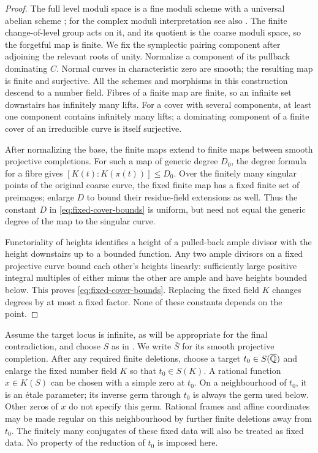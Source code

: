 \begin{proof}
The full level moduli space is a fine moduli scheme with a universal abelian
scheme \cite[Chapter~I, Theorem~1.4]{Chai1985}; for the complex moduli
interpretation see also \cite[Theorem~4.6 and Corollary~4.7]{MilneModuli2013}.
The finite change-of-level group acts on it, and its quotient is the
coarse moduli space, so the forgetful map is finite.  We fix the
symplectic pairing component after adjoining the relevant roots of unity.
Normalize a component of its
pullback dominating $C$.  Normal curves in characteristic zero are smooth;
the resulting map is finite and surjective.  All the schemes and morphisms
in this construction descend to a number field.  Fibres of a finite map are
finite, so an infinite set downstairs has infinitely many lifts.  For a
cover with several components, at least one component contains infinitely
many lifts; a dominating component of a finite cover of an irreducible
curve is itself surjective.

After normalizing the base, the finite maps extend to finite maps between
smooth projective completions.  For such a map of generic degree $D_0$,
the degree formula for a fibre gives
$[K(t):K(\pi(t))]\leq D_0$.  Over the finitely many singular points of
the original coarse curve, the fixed finite map has a fixed finite set
of preimages; enlarge $D$ to bound their residue-field extensions as
well.  Thus the constant $D$ in \eqref{eq:fixed-cover-bounds} is uniform,
but need not equal the generic degree of the map to the singular curve.

Functoriality of heights identifies a height of a pulled-back ample
divisor with the height downstairs up to a bounded function.  Any two
ample divisors on a fixed projective curve bound each other's heights
linearly: sufficiently large positive integral multiples of either minus
the other are ample and have heights bounded below.  This proves
\eqref{eq:fixed-cover-bounds}.  Replacing the fixed field $K$ changes
degrees by at most a fixed factor.  None of these constants depends on the
point.
\end{proof}

Assume the target locus is infinite, as will be appropriate for the final
contradiction, and choose $S$ as in .  We write
$\bar S$ for its smooth projective completion.  After any required finite
deletions, choose a target $t_0\in S(\overline{\mathbb Q})$ and enlarge the fixed number
field $K$ so that $t_0\in S(K)$.  A rational function $x\in K(S)$ can be
chosen with a simple zero at $t_0$.  On a neighbourhood of $t_0$, it is an
\'etale parameter; its inverse germ through $t_0$ is always the germ used
below.  Other zeros of $x$ do not specify this germ.  Rational frames and
affine coordinates may be made regular on this neighbourhood by further
finite deletions away from $t_0$.  The finitely many conjugates of these
fixed data will also be treated as fixed data.  No property of the
reduction of $t_0$ is imposed here.

